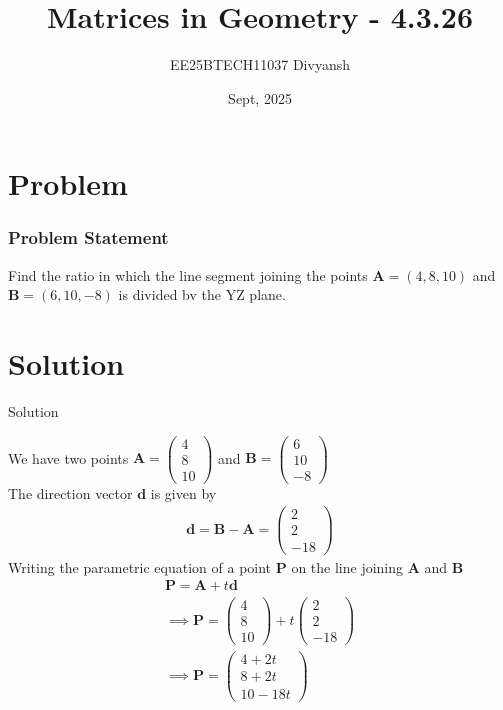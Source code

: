 \documentclass{beamer}
\title{Matrices in Geometry - 4.3.26}
\author{EE25BTECH11037  Divyansh}
\date{Sept, 2025}
\let\vec\mathbf
\providecommand{\brak}[1]{\ensuremath{\left(#1\right)}}
\theoremstyle{remark}
\newcommand{\myvec}[1]{\ensuremath{\begin{pmatrix}#1\end{pmatrix}}}
\begin{document}
\maketitle


\section{Problem}
\begin{frame}
\frametitle{Problem Statement}
Find the ratio in which the line segment joining the points $\vec{A}=\brak{4,8,10}$ and $\vec{B}=\brak{6, 10, -8}$ is divided bv the YZ plane.
\end{frame}

\section{Solution}
\begin{frame}{Solution}
   
We have two points $\vec{A}=\myvec{4\\ 8 \\  10}$ and $\vec{B}=\myvec{6\\  10\\ -8}$\\
The direction vector $\vec{d}$ is given by
\begin{align}
    \vec{d}=\vec{B} - \vec{A}=\myvec{2 \\ 2 \\ -18}
\end{align}
Writing the parametric equation of a point $\vec{P}$ on the line joining $\vec{A}$ and $\vec{B}$
\begin{align}
    \vec{P} =  \vec{A} + t\vec{d}\\
    \implies \vec{P} = \myvec{4 \\ 8 \\ 10} + t\myvec{2 \\ 2 \\ -18}\\
    \implies \vec{P} = \myvec{4+2t \\ 8+2t \\ 10 -18t}
\end{align}
\end{frame}
\end{document}
